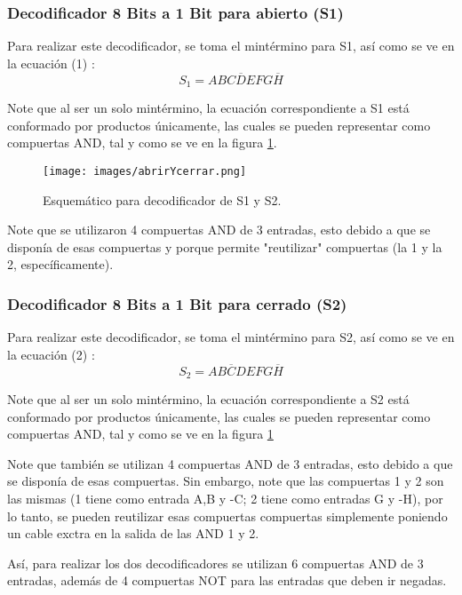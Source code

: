 \documentclass[conference]{IEEEtran}  %
\begin{document}
\subsubsection{Decodificador 8 Bits a 1 Bit para abierto (S1)}

Para realizar este decodificador, se toma el mintérmino para S1, así como se ve en la ecuación (1) :
\begin{equation}
S_1 = AB\overline{CDE}FG\overline{H}
\end{equation}

Note que al ser un solo mintérmino, la ecuación correspondiente a S1 está conformado por productos únicamente, las cuales se pueden representar como compuertas AND, tal y como se ve en la figura \ref{fig:s1y2}.

\begin{figure}[h]
    \centering
    \texttt{[image: images/abrirYcerrar.png]}
    \caption{Esquemático para decodificador de S1 y S2.}
    \label{fig:s1y2}
\end{figure}

Note que se utilizaron 4 compuertas AND de 3 entradas, esto debido a que se disponía de esas compuertas y porque permite "reutilizar" compuertas (la 1 y la 2, específicamente). 

\subsubsection{Decodificador 8 Bits a 1 Bit para cerrado (S2) } 

Para realizar este decodificador, se toma el mintérmino para S2, así como se ve en la ecuación (2) :
\begin{equation}
S_2 = AB\overline{C}DEFG\overline{H}
\end{equation}

Note que al ser un solo mintérmino, la ecuación correspondiente a S2 está conformado por productos únicamente, las cuales se pueden representar como compuertas AND, tal y como se ve en la figura \ref{fig:s1y2}

Note que también se utilizan 4 compuertas AND de 3 entradas, esto debido a que se disponía de esas compuertas. Sin embargo, note que las compuertas 1 y 2 son las mismas (1 tiene como entrada A,B y -C; 2 tiene como entradas G y -H), por lo tanto, se pueden reutilizar esas compuertas compuertas simplemente poniendo un cable exctra en la salida de las AND 1 y 2. 

Así, para realizar los dos decodificadores se utilizan 6 compuertas AND de 3 entradas, además de 4 compuertas NOT para las entradas que deben ir negadas.
\end{document}
